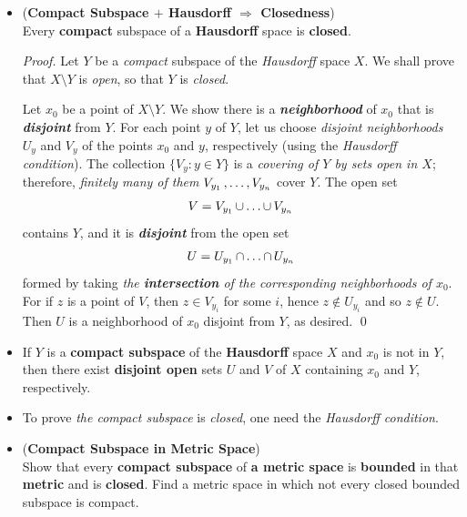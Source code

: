 \documentclass[11pt]{article}
\begin{document}
\begin{itemize}
\item \begin{proposition} (\textbf{Compact Subspace $+$ Hausdorff $\Rightarrow$ Closedness}) \citep{munkres2000topology}\\
Every \textbf{compact} subspace of a \textbf{Hausdorff} space is \textbf{closed}.
\end{proposition}
\begin{proof}
Let $Y$ be a \emph{compact} subspace of the \emph{Hausdorff} space $X$. We shall prove that $X \setminus Y$ is \emph{open}, so that $Y$ is \emph{closed}.

Let $x_0$ be a point of $X \setminus Y$. We show there is a \emph{\textbf{neighborhood}} of $x_0$ that is \emph{\textbf{disjoint}} from $Y$. For each point $y$ of $Y$, let us choose \emph{disjoint neighborhoods} $U_y$ and $V_y$ of the points $x_0$ and $y$, respectively (using the \emph{Hausdorff condition}). The collection $\{V_y:  y \in Y\}$ is a \emph{covering of $Y$ by sets open in $X$}; therefore, \emph{finitely many of them} $V_{y_1} \,{,}\ldots{,}\, V_{y_n}$ cover $Y$. The open set
\begin{align*}
V = V_{y_1} \,{\cup}\ldots{\cup}\, V_{y_n}
\end{align*}
contains $Y$, and it is \emph{\textbf{disjoint}} from the open set
\begin{align*}
U = U_{y_1} \,{\cap}\ldots{\cap}\, U_{y_n}
\end{align*}
formed by taking \emph{the \textbf{intersection} of the corresponding neighborhoods of $x_0$}. For if $z$ is a point of $V$, then $z \in V_{y_i}$ for some $i$, hence $z \not\in  U_{y_i}$ and so $z \not\in U$.  Then $U$ is a neighborhood of $x_0$ disjoint from $Y$, as desired. \qed 
\end{proof}

\item \begin{proposition}
If $Y$ is a \textbf{compact subspace} of the \textbf{Hausdorff} space $X$ and $x_0$ is not in $Y$, then there exist \textbf{disjoint open} sets $U$ and $V$ of $X$ containing $x_0$ and $Y$, respectively.
\end{proposition}

\item \begin{remark}
To prove \emph{the compact subspace} is \emph{closed}, one need the \emph{Hausdorff condition}.
\end{remark}

\item \begin{exercise}(\textbf{Compact Subspace in Metric Space})\\
Show that every \textbf{compact subspace} of \textbf{a metric space} is \textbf{bounded} in that \textbf{metric} and is \textbf{closed}. Find a metric space in which not every closed bounded subspace is compact.
\end{exercise}



\end{itemize}
\end{document}
